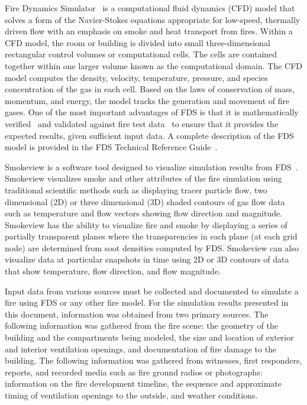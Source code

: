 \documentclass[12pt,oneside]{book}
\begin{document}
Fire Dynamics Simulator~\cite{FDS_Users_Guide} is a computational fluid dynamics (CFD) model that solves a form of the Navier-Stokes equations appropriate for low-speed, thermally driven flow with an emphasis on smoke and heat transport from fires. Within a CFD model, the room or building is divided into small three-dimensional rectangular control volumes or computational cells. The cells are contained together within one larger volume known as the computational domain. The CFD model computes the density, velocity, temperature, pressure, and species concentration of the gas in each cell. Based on the laws of conservation of mass, momentum, and energy, the model tracks the generation and movement of fire gases. One of the most important advantages of FDS is that it is mathematically verified~\cite{FDS_Verification_Guide} and validated against fire test data~\cite{FDS_Validation_Guide} to ensure that it provides the expected results, given sufficient input data. A complete description of the FDS model is provided in the FDS Technical Reference Guide~\cite{FDS_Math_Guide}.

Smokeview is a software tool designed to visualize simulation results from FDS~\cite{Smokeview_Users_Guide}. Smokeview visualizes smoke and other attributes of the fire simulation using traditional scientific methods such as displaying tracer particle flow, two dimensional (2D) or three dimensional (3D) shaded contours of gas flow data such as temperature and flow vectors showing flow direction and magnitude. Smokeview has the ability to visualize fire and smoke by displaying a series of partially transparent planes where the transparencies in each plane (at each grid node) are determined from soot densities computed by FDS. Smokeview can also visualize data at particular snapshots in time using 2D or 3D contours of data that show temperature, flow direction, and flow magnitude.

Input data from various sources must be collected and documented to simulate a fire using FDS or any other fire model. For the simulation results presented in this document, information was obtained from two primary sources. The following information was gathered from the fire scene: the geometry of the building and the compartments being modeled, the size and location of exterior and interior ventilation openings, and documentation of fire damage to the building. The following information was gathered from witnesses, first responders, reports, and recorded media such as fire ground radios or photographs: information on the fire development timeline, the sequence and approximate timing of ventilation openings to the outside, and weather conditions.
\end{document}
